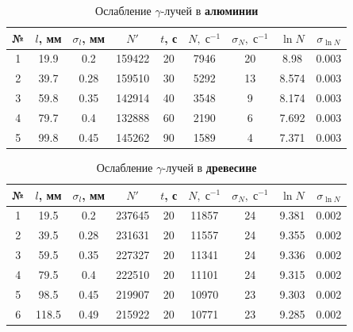 \documentclass[12pt]{kiarticle}
\newcommand{\ga}{\ensuremath{\gamma}}
\begin{document}
\begin{table}[h!]
	\caption{Ослабление \ga-лучей в \textbf{алюминии}}
	\begin{center}
		\begin{tabular}{|c|c|c|c|c|c|c|c|c|}
			\hline
			№ & $ l $, мм & $ \sigma_l $, мм & $ N' $ & $ t $, с & $ N, \; с^{-1}$  & $ \sigma_N, \; с^{-1}$ & $ \ln N $ & $ \sigma_{\ln N} $ \\
			\hline
			1 & 19.9 & 0.2 & 159422 & 20 & 7946 & 20 & 8.98 & 0.003 \\
			2 & 39.7 & 0.28 & 159510 & 30 & 5292 & 13 & 8.574 & 0.003 \\
			3 & 59.8 & 0.35 & 142914 & 40 & 3548 & 9 & 8.174 & 0.003 \\
			4 & 79.7 & 0.4 & 132888 & 60 & 2190 & 6 & 7.692 & 0.003 \\
			5 & 99.8 & 0.45 & 145262 & 90 & 1589 & 4 & 7.371 & 0.003 \\
			\hline
		\end{tabular}
	\end{center}
	\label{table_3}
\end{table}

\begin{table}[h]
	\caption{Ослабление \ga-лучей в \textbf{древесине}}
	\begin{center}
		\begin{tabular}{|c|c|c|c|c|c|c|c|c|}
			\hline
			№ & $ l $, мм & $ \sigma_l $, мм & $ N' $ & $ t $, с & $ N, \; с^{-1}$  & $ \sigma_N, \; с^{-1}$ & $ \ln N $ & $ \sigma_{\ln N} $ \\
			\hline
			1 & 19.5 & 0.2 & 237645 & 20 & 11857 & 24 & 9.381 & 0.002 \\
			2 & 39.5 & 0.28 & 231631 & 20 & 11557 & 24 & 9.355 & 0.002 \\
			3 & 59.5 & 0.35 & 227327 & 20 & 11341 & 24 & 9.336 & 0.002 \\
			4 & 79.5 & 0.4 & 222510 & 20 & 11101 & 24 & 9.315 & 0.002 \\
			5 & 98.5 & 0.45 & 219907 & 20 & 10970 & 23 & 9.303 & 0.002 \\
			6 & 118.5 & 0.49 & 215922 & 20 & 10771 & 23 & 9.285 & 0.002 \\
			\hline
		\end{tabular}
	\end{center}
	\label{table_4}
\end{table}


	
	
\end{document}
